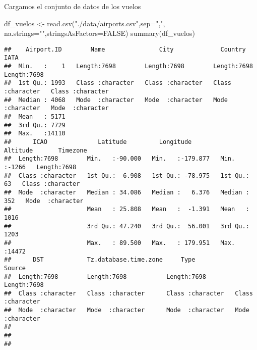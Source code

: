 \documentclass[
]{article}
\newenvironment{Shaded}{\begin{snugshade}}{\end{snugshade}}
\newcommand{\DataTypeTok}[1]{\textcolor[rgb]{0.87,0.87,0.75}{#1}}
\newcommand{\KeywordTok}[1]{\textcolor[rgb]{0.94,0.87,0.69}{#1}}
\newcommand{\NormalTok}[1]{\textcolor[rgb]{0.80,0.80,0.80}{#1}}
\newcommand{\OtherTok}[1]{\textcolor[rgb]{0.94,0.94,0.56}{#1}}
\newcommand{\StringTok}[1]{\textcolor[rgb]{0.80,0.58,0.58}{#1}}
\begin{document}
Cargamos el conjunto de datos de los vuelos

\begin{Shaded}
\begin{Highlighting}[]
\NormalTok{df_vuelos <-}\StringTok{ }\KeywordTok{read.csv}\NormalTok{(}\StringTok{"./data/airports.csv"}\NormalTok{,}\DataTypeTok{sep=}\StringTok{","}\NormalTok{, }\DataTypeTok{na.strings=}\StringTok{""}\NormalTok{,}\DataTypeTok{stringsAsFactors=}\OtherTok{FALSE}\NormalTok{)}
\KeywordTok{summary}\NormalTok{(df_vuelos)}
\end{Highlighting}
\end{Shaded}

\begin{verbatim}
##    Airport.ID        Name               City             Country              IATA          
##  Min.   :    1   Length:7698        Length:7698        Length:7698        Length:7698       
##  1st Qu.: 1993   Class :character   Class :character   Class :character   Class :character  
##  Median : 4068   Mode  :character   Mode  :character   Mode  :character   Mode  :character  
##  Mean   : 5171                                                                              
##  3rd Qu.: 7729                                                                              
##  Max.   :14110                                                                              
##      ICAO              Latitude         Longitude           Altitude       Timezone        
##  Length:7698        Min.   :-90.000   Min.   :-179.877   Min.   :-1266   Length:7698       
##  Class :character   1st Qu.:  6.908   1st Qu.: -78.975   1st Qu.:   63   Class :character  
##  Mode  :character   Median : 34.086   Median :   6.376   Median :  352   Mode  :character  
##                     Mean   : 25.808   Mean   :  -1.391   Mean   : 1016                     
##                     3rd Qu.: 47.240   3rd Qu.:  56.001   3rd Qu.: 1203                     
##                     Max.   : 89.500   Max.   : 179.951   Max.   :14472                     
##      DST            Tz.database.time.zone     Type              Source         
##  Length:7698        Length:7698           Length:7698        Length:7698       
##  Class :character   Class :character      Class :character   Class :character  
##  Mode  :character   Mode  :character      Mode  :character   Mode  :character  
##                                                                                
##                                                                                
## 
\end{verbatim}
\end{document}
